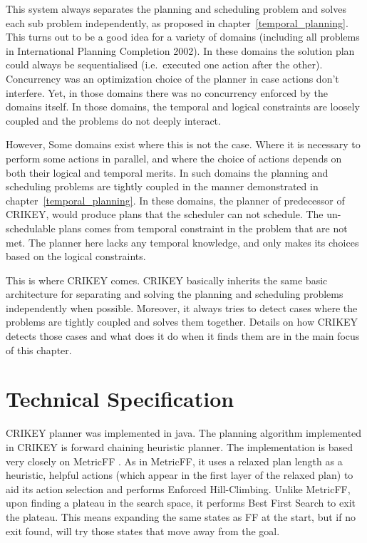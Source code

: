 \documentclass
[a4paper
,english
,parskip=half
,bibliography=totoc
]{scrreprt}
\begin{document}
    This system always separates the planning and scheduling problem and solves each sub problem independently, as proposed in chapter~\ref{temporal_planning}. This turns out to be a good idea for a variety of domains (including all problems in International Planning Completion 2002). In these domains the solution plan could always be sequentialised (i.e.\ executed one action after the other). Concurrency was an optimization choice of the planner in case actions don't interfere. Yet, in those domains there was no concurrency enforced by the domains itself. In those domains, the temporal and logical constraints are loosely coupled and the problems do not deeply interact. 

    However, Some domains exist where this is not the case. Where it is necessary to perform some actions in parallel, and where the choice of actions depends on both their logical and temporal merits. In such domains the planning and scheduling problems are tightly coupled in the manner demonstrated in chapter~\ref{temporal_planning}. In these domains, the planner of predecessor of CRIKEY, would produce plans that the scheduler can not schedule. The un-schedulable plans comes from temporal constraint in the problem that are not met. The planner here lacks any temporal knowledge, and only makes its choices based on the logical constraints.

    This is where CRIKEY comes. CRIKEY basically inherits the same basic architecture for separating and solving the planning and scheduling problems independently when possible. Moreover, it always tries to detect cases where the problems are tightly coupled and solves them together. Details on how CRIKEY detects those cases and what does it do when it finds them are in the main focus of this chapter.

    \section{Technical Specification} \label{tech}
    CRIKEY planner was implemented in java.
    The planning algorithm implemented in CRIKEY is forward chaining heuristic planner.
    The implementation is based very closely on MetricFF \citep{hoffmann:ecai-02}.
    As in MetricFF, it uses a relaxed plan length as a heuristic, helpful actions (which appear in the first layer of the relaxed plan) to aid its action selection and performs Enforced Hill-Climbing.
    Unlike MetricFF, upon finding a plateau in the search space, it performs Best First Search to exit the plateau.
    This means expanding the same states as FF at the start, but if no exit found, will try those states that move away from the goal.
\end{document}
